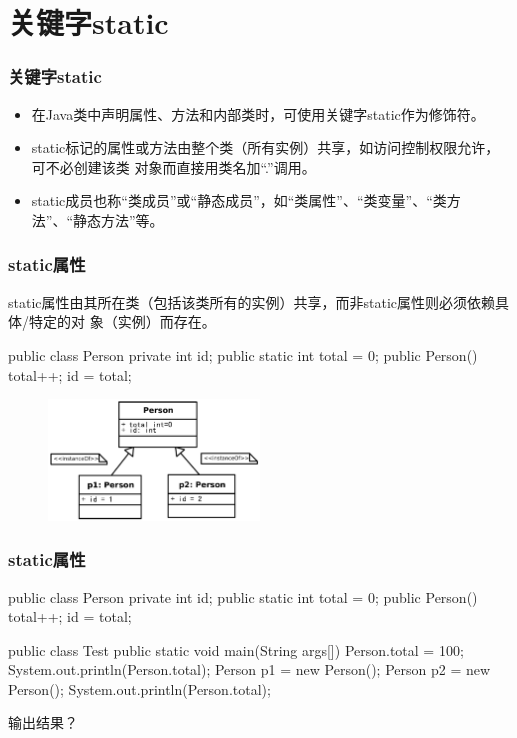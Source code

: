\documentclass[hyperref={pdfpagelabels=false},compress,table]{beamer} %
\newcommand{\hei}{\CJKfamily{SimHei}}
\def\Red{\color{red}}
\def\Blue{\color{blue}}
\begin{document}
\section{关键字static}
\begin{frame}[fragile] %
\frametitle{关键字static}
\begin{itemize}
\item 在Java类中声明{\hei\Red 属性、方法和内部类}时，可使用关键字static作为修饰符。
\item static标记的属性或方法由整个类（所有实例）共享，如访问控制权限允许，可不必创建该类
  对象而直接用类名加“.”调用。
\item static成员也称{\hei\Blue “类成员”或“静态成员”}，如“类属性”、“类变量”、“类方法”、“静态方法”等。
\end{itemize}
\end{frame}

\begin{frame}[fragile] %
\frametitle{static属性}

static属性由其所在类（包括该类所有的实例）共享，而非static属性则必须依赖具体/特定的对
象（实例）而存在。

\begin{javaCode}
public class Person {
  private int id;
  public static int total = 0;
  public Person() {
    total++;
    id = total;
  }
}
\end{javaCode}
\begin{figure}
\centering
\includegraphics[width=0.5\textwidth]{b.pdf}
\end{figure}
\end{frame}

\begin{frame}[fragile] %
\frametitle{static属性}
\begin{javaCode}
public class Person {
  private int id;
  public static int total = 0;
  public Person() {
    total++;
    id = total;
  }
}
\end{javaCode}

\begin{javaCode}
public class Test {
  public static void main(String args[]) {
    Person.total = 100;
    System.out.println(Person.total);
    Person p1 = new Person();
    Person p2 = new Person();
    System.out.println(Person.total);
  }
}
\end{javaCode}
输出结果？
\end{frame}
\end{document}
